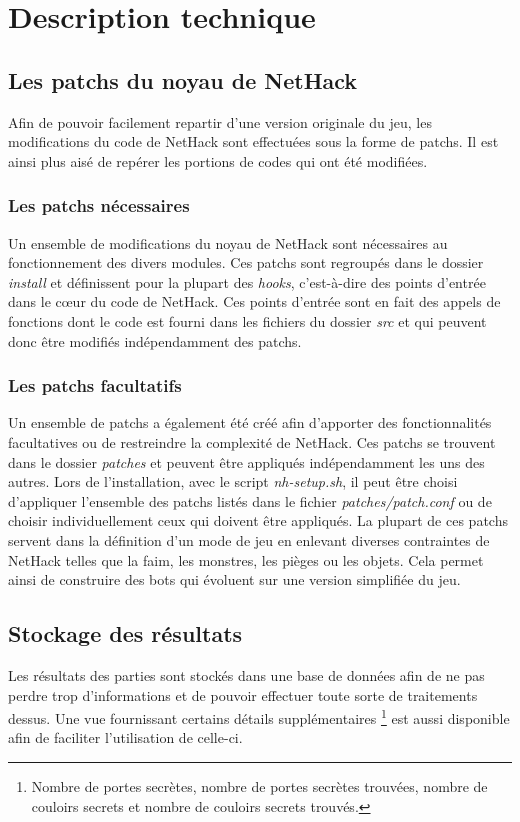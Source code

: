 \documentclass[10pt,a4paper]{report}
\begin{document}
\chapter{Description technique}
\section{Les patchs du noyau de NetHack}
Afin de pouvoir facilement repartir d'une version originale du jeu, les
modifications du code de NetHack sont effectuées sous la forme de patchs. Il
est ainsi plus aisé de repérer les portions de codes qui ont été modifiées.

\subsection{Les patchs nécessaires}
Un ensemble de modifications du noyau de NetHack sont nécessaires au
fonctionnement des divers modules. Ces patchs sont regroupés dans le dossier
\emph{install} et définissent pour la plupart des \emph{hooks}, c'est-à-dire des
points d'entrée dans le cœur du code de NetHack. Ces points d'entrée sont en
fait des appels de fonctions dont le code est fourni dans les fichiers du
dossier \emph{src} et qui peuvent donc être modifiés indépendamment des patchs.

\subsection{Les patchs facultatifs}
Un ensemble de patchs a également été créé afin d'apporter des fonctionnalités
facultatives ou de restreindre la complexité de NetHack. Ces patchs se
trouvent dans le dossier \emph{patches} et peuvent être appliqués
indépendamment les uns des autres. Lors de l'installation, avec le script
\emph{nh-setup.sh}, il peut être choisi d'appliquer l'ensemble des patchs
listés dans le fichier \emph{patches/patch.conf} ou de choisir
individuellement ceux qui doivent être appliqués.
La plupart de ces patchs servent dans la définition d'un mode de jeu en
enlevant diverses contraintes de NetHack telles que la faim, les monstres, les
pièges ou les objets. Cela permet ainsi de construire des bots qui évoluent sur
une version simplifiée du jeu.

\section{Stockage des résultats}
Les résultats des parties sont stockés dans une base de données afin de ne pas perdre
trop d'informations et de pouvoir effectuer toute sorte de traitements dessus. Une vue
fournissant certains détails supplémentaires \footnote{Nombre de portes secrètes,
nombre de portes secrètes trouvées, nombre de couloirs secrets et nombre de couloirs
secrets trouvés.} est aussi disponible afin de faciliter l'utilisation de celle-ci.
\end{document}
